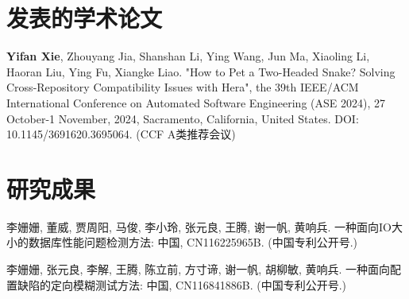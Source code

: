 
\begin{resume}
	

  \section*{发表的学术论文} %

  \begin{enumerate}[label={[\arabic*]},itemsep=0pt,parsep=0pt,labelindent=26pt,labelwidth=*,leftmargin=0pt,itemindent=*,align=left]
   
  \item \textbf{Yifan Xie}, Zhouyang Jia, Shanshan Li, Ying Wang, Jun Ma, Xiaoling Li, Haoran Liu, Ying Fu, Xiangke Liao. "How to Pet a Two-Headed Snake? Solving Cross-Repository Compatibility Issues with Hera", the 39th IEEE/ACM International Conference on Automated Software Engineering (ASE 2024), 27 October-1 November, 2024, Sacramento, California, United States. DOI: 10.1145/3691620.3695064. (CCF A类推荐会议)
  \end{enumerate}

  \section*{研究成果} %
  \begin{enumerate}[label={[\arabic*]},itemsep=0pt,parsep=0pt,labelindent=26pt,labelwidth=*,leftmargin=0pt,itemindent=*,align=left]
  \item 李姗姗, 董威, 贾周阳, 马俊, 李小玲, 张元良, 王腾, 谢一帆, 黄响兵. 一种面向IO大小的数据库性能问题检测方法: 中国, CN116225965B. (中国专利公开号.)
  \item 李姗姗, 张元良, 李解, 王腾, 陈立前, 方寸谛, 谢一帆, 胡柳敏, 黄响兵. 一种面向配置缺陷的定向模糊测试方法: 中国, CN116841886B. (中国专利公开号.)
  \end{enumerate}

\end{resume}
